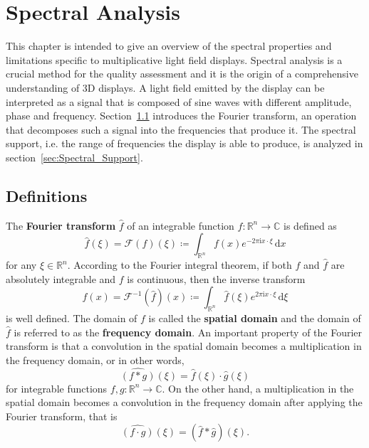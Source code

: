 \chapter{Spectral Analysis}


This chapter is intended to give an overview of the spectral properties and limitations specific to multiplicative light field displays.
Spectral analysis is a crucial method for the quality assessment and it is the origin of a comprehensive understanding of 3D displays. 
A light field emitted by the display can be interpreted as a signal that is composed of sine waves with different amplitude, phase and frequency.
Section~\ref{sec:Definitions} introduces the Fourier transform, an operation that decomposes such a signal into the frequencies that produce it.
The spectral support, i.e. the range of frequencies the display is able to produce, is analyzed in section~\ref{sec:Spectral_Support}. 

\section{Definitions}
\label{sec:Definitions}

The \textbf{Fourier transform} $\hat{f}$ of an integrable function $f \colon \mathbb{R}^n \to \mathbb{C}$ is defined as 
\begin{equation}
	\hat{f}(\xi) = \mathcal{F}(f)(\xi) \coloneqq \int_{\mathbb{R}^n} f(x) e^{-2 \pi \mathrm{i} x \cdot \xi} \, \mathrm{d}x
\end{equation}
for any $\xi \in \mathbb{R}^n$. 
According to the Fourier integral theorem, if both $f$ and $\hat{f}$ are absolutely integrable and $f$ is continuous, then the inverse transform 
\begin{equation}
	f(x) = \mathcal{F}^{-1}(\hat{f})(x) \coloneqq \int_{\mathbb{R}^n} \hat{f}(\xi) e^{2 \pi \mathrm{i} x \cdot \xi} \, \mathrm{d}\xi
\end{equation}
is well defined.
The domain of $f$ is called the \textbf{spatial domain} and the domain of $\hat{f}$ is referred to as the \textbf{frequency domain}.
An important property of the Fourier transform is that a convolution in the spatial domain becomes a multiplication in the frequency domain, or in other words, 
\begin{equation}
	\widehat{(f \ast g)}(\xi) = \hat{f}(\xi) \cdot \hat{g}(\xi)
\end{equation}
for integrable functions $f, g \colon \mathbb{R}^n \to \mathbb{C}$.
On the other hand, a multiplication in the spatial domain becomes a convolution in the frequency domain after applying the Fourier transform, that is
\begin{equation}
	\widehat{(f \cdot g)}(\xi) = (\hat{f} \ast \hat{g})(\xi).
\end{equation}


